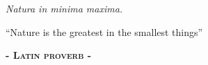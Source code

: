 %
%
%
%
%
%
%
%
%
%
%
%
%

{\pagestyle{empty}

\null{}
\begin{flushright}
\begin{Large}
\textit{Natura in minima maxima.}
\end{Large}

\vspace{0.25cm}

``Nature is the greatest in the smallest things''

\vspace{0.25cm}

\textbf{- \textsc{Latin proverb} -}
\end{flushright}
\null{}

\cleardoublepage}

\frontmatter 

\cleardoublepage
{}
\tableofcontents %

\mainmatter %
